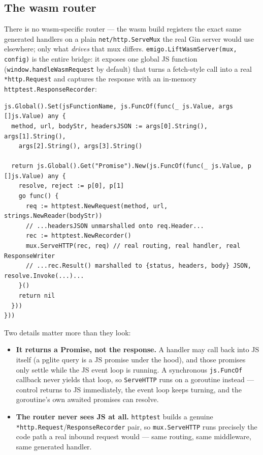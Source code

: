 \subsection{The wasm router}
\label{sec:wasm-router}
There is no wasm-specific router --- the wasm build registers the exact
same generated handlers on a plain \texttt{net/http.ServeMux} the real
Gin server would use elsewhere; only what \emph{drives} that mux differs.
\texttt{emigo.LiftWasmServer(mux, config)} is the entire bridge: it
exposes one global JS function (\texttt{window.handleWasmRequest} by
default) that turns a fetch-style call into a real \texttt{*http.Request}
and captures the response with an in-memory
\texttt{httptest.ResponseRecorder}:
\begin{lstlisting}
js.Global().Set(jsFunctionName, js.FuncOf(func(_ js.Value, args []js.Value) any {
  method, url, bodyStr, headersJSON := args[0].String(), args[1].String(),
    args[2].String(), args[3].String()

  return js.Global().Get("Promise").New(js.FuncOf(func(_ js.Value, p []js.Value) any {
    resolve, reject := p[0], p[1]
    go func() {
      req := httptest.NewRequest(method, url, strings.NewReader(bodyStr))
      // ...headersJSON unmarshalled onto req.Header...
      rec := httptest.NewRecorder()
      mux.ServeHTTP(rec, req) // real routing, real handler, real ResponseWriter
      // ...rec.Result() marshalled to {status, headers, body} JSON, resolve.Invoke(...)...
    }()
    return nil
  }))
}))
\end{lstlisting}
Two details matter more than they look:
\begin{itemize}[leftmargin=1.1em,itemsep=2pt,topsep=2pt]
  \item \textbf{It returns a Promise, not the response.} A handler may
    call back into JS itself (a pglite query is a JS promise under the
    hood), and those promises only settle while the JS event loop is
    running. A synchronous \texttt{js.FuncOf} callback never yields that
    loop, so \texttt{ServeHTTP} runs on a goroutine instead --- control
    returns to JS immediately, the event loop keeps turning, and the
    goroutine's own awaited promises can resolve.
  \item \textbf{The router never sees JS at all.} \texttt{httptest}
    builds a genuine \texttt{*http.Request}/\texttt{ResponseRecorder}
    pair, so \texttt{mux.ServeHTTP} runs precisely the code path a real
    inbound request would --- same routing, same middleware, same
    generated handler.
\end{itemize}

